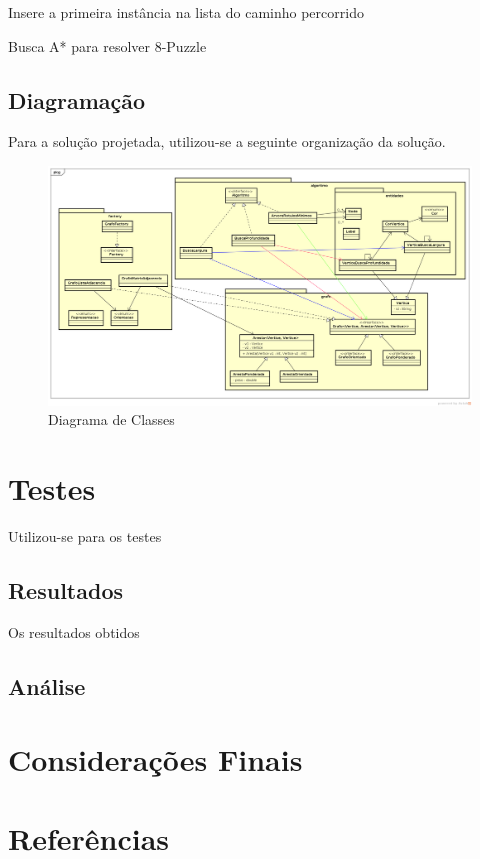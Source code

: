 \documentclass[12pt]{article}
\begin{document}
	\begin{algorithm}[H]
		Insere a primeira instância na lista do caminho percorrido\;
		\caption{Busca A* para resolver 8-Puzzle}
	\end{algorithm}

	\subsection{Diagramação}\label{sec:diagramacao}

		Para a solução projetada, utilizou-se a seguinte organização da solução.

		\begin{landscape}
		\centering
		\begin{figure}[p]
		\includegraphics[width=1.4\textwidth]{ClassDiagram.png}
	\caption{Diagrama de Classes}
	\label{fig:classDiagram}
	\end{figure}
	\end{landscape}
	\restoregeometry

\section{Testes}\label{sec:testes}
	
	Utilizou-se para os testes 

	\subsection{Resultados}\label{sec:resultados}
		
		Os resultados obtidos 
		
	\subsection{Análise}\label{sec:analise}

\section{Considerações Finais}\label{sec:conclusao}

\section{Referências}\label{sec:referencia}

\end{document}
